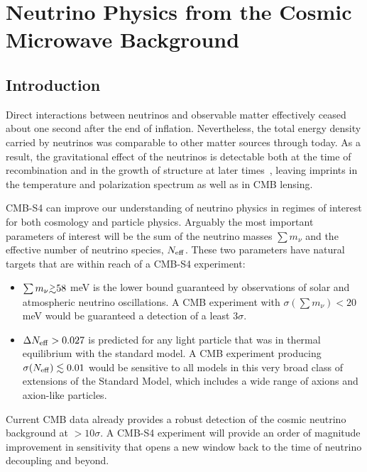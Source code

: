  
\chapter{Neutrino Physics from the Cosmic Microwave Background}
\renewcommand*\thesection{\arabic{section}}

\def\beq{\begin{equation}}
\def\eeq{\end{equation}}

\def\bea{\begin{eqnarray}}
\def\eea{\end{eqnarray}}

\def\Neff{N_{\rm eff}}
\def\gtrsim{\raise-.75ex\hbox{$\buildrel>\over\sim$}}

\section{Introduction}

Direct interactions between neutrinos and observable matter effectively ceased about one second after the end of inflation.  Nevertheless, the total energy density carried by neutrinos was comparable to other matter sources through today.  As a result, the gravitational effect of the neutrinos is detectable both at the time of recombination and in the growth of structure at later times~\cite{Abazajian:2013oma}, leaving imprints in the temperature and polarization spectrum as well as in CMB lensing.

CMB-S4 can improve our understanding of neutrino physics in regimes of interest for both cosmology and particle physics.  Arguably the most important parameters of interest will be the sum of the neutrino masses $\sum m_\nu$ and the effective number of neutrino species, $\Neff$.  These two parameters have natural targets that are within reach of a CMB-S4 experiment:
\begin{itemize}
\item $ \sum m_\nu \gtrsim 58$ meV is the lower bound guaranteed by observations of solar and atmospheric neutrino oscillations.  A CMB experiment with $\sigma(\sum m_\nu) < 20$ meV would be guaranteed a detection of a least 3$\sigma$.
\item $\Delta \Neff > 0.027$ is predicted for any light particle that was in thermal equilibrium with the standard model.  A CMB experiment producing $\sigma(\Neff) \lesssim 0.01$ would be sensitive to all models in this very broad class of extensions of the Standard Model, which includes a wide range of axions and axion-like particles.  
\end{itemize}
Current CMB data already provides a robust detection of the cosmic neutrino background at $>10 \sigma$.  A CMB-S4 experiment will provide an order of magnitude improvement in sensitivity that opens a new window back to the time of neutrino decoupling and beyond.

